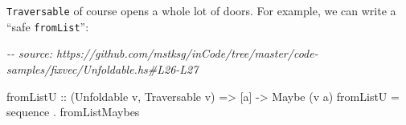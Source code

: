 \documentclass[]{article}
\newenvironment{Shaded}{}{}
\newcommand{\CommentTok}[1]{\textcolor[rgb]{0.38,0.63,0.69}{\textit{#1}}}
\newcommand{\DataTypeTok}[1]{\textcolor[rgb]{0.56,0.13,0.00}{#1}}
\newcommand{\DecValTok}[1]{\textcolor[rgb]{0.25,0.63,0.44}{#1}}
\newcommand{\FunctionTok}[1]{\textcolor[rgb]{0.02,0.16,0.49}{#1}}
\newcommand{\NormalTok}[1]{#1}
\newcommand{\OperatorTok}[1]{\textcolor[rgb]{0.40,0.40,0.40}{#1}}
\newcommand{\OtherTok}[1]{\textcolor[rgb]{0.00,0.44,0.13}{#1}}
\newcommand{\StringTok}[1]{\textcolor[rgb]{0.25,0.44,0.63}{#1}}
\begin{document}
\begin{Shaded}
\end{Shaded}

\texttt{Traversable} of course opens a whole lot of doors. For example, we can
write a ``safe \texttt{fromList}'':

\begin{Shaded}
\begin{Highlighting}[]
\CommentTok{{-}{-} source: https://github.com/mstksg/inCode/tree/master/code{-}samples/fixvec/Unfoldable.hs\#L26{-}L27}

\OtherTok{fromListU ::}\NormalTok{ (}\DataTypeTok{Unfoldable}\NormalTok{ v, }\DataTypeTok{Traversable}\NormalTok{ v) }\OtherTok{=>}\NormalTok{ [a] }\OtherTok{{-}>} \DataTypeTok{Maybe}\NormalTok{ (v a)}
\NormalTok{fromListU }\OtherTok{=} \FunctionTok{sequence} \OperatorTok{.}\NormalTok{ fromListMaybes}
\end{Highlighting}
\end{Shaded}
\end{document}
